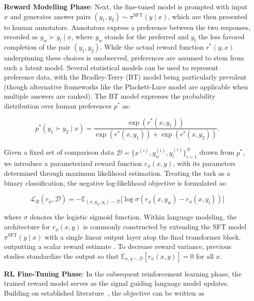 \textbf{Reward Modelling Phase}: Next, the fine-tuned model is prompted with input $x$ and generates answer pairs $(y_1, y_2)\sim \pi^\text{SFT}(y \mid x)$, which are then presented to human annotators. Annotators express a preference between the two responses, recorded as $y_w\succ y_l \mid x$, where $y_w$ stands for the preferred and $y_l$ the less favored completion of the pair $(y_1, y_2)$. While the actual reward function $r^*(y, x)$ underpinning these choices is unobserved, preferences are assumed to stem from such a latent model. Several statistical models can be used to represent preference data, with the Bradley-Terry (BT) model \cite{bradley1952rankanalysis} being particularly prevalent (though alternative frameworks like the Plackett-Luce model \citep{plackett1975analysis, luce2012individual} are applicable when multiple answers are ranked). The BT model expresses the probability distribution over human preferences $p^*$ as:

\begin{equation}\label{eq:bradley-terry}
    p^*(y_1\succ y_2 \mid x)=\frac{\exp\left(r^*(x, y_1)\right)}{\exp\left(r^*(x, y_1)\right) + \exp\left(r^*(x, y_2)\right)}.
\end{equation}

Given a fixed set of comparison data $\mathcal{D}=\bigl\{x^{(i)}, y_w^{(i)}, y_l^{(i)}\bigr\}_{i=1}^N$ drawn from $p^*$, we introduce a parameterized reward function $r_{\phi}(x, y)$, with its parameters determined through maximum likelihood estimation. Treating the task as a binary classification, the negative log-likelihood objective is formulated as:

\begin{equation}\label{eq:reward_model}
    \mathcal{L}_R(r_{\phi}, \mathcal{D}) = -\mathbb{E}_{(x, y_w, y_l)\sim \mathcal{D}}\bigl[\log \sigma(r_{\phi}(x, y_w)- r_{\phi}(x, y_l))\bigr]
\end{equation}

where $\sigma$ denotes the logistic sigmoid function. Within language modeling, the architecture for $r_{\phi}(x, y)$ is commonly constructed by extending the SFT model $\pi^\text{SFT}(y \mid x)$ with a single linear output layer atop the final transformer block, outputting a scalar reward estimate \cite{ziegler2020finetuning}. To decrease reward variance, previous studies standardize the output so that $\mathbb{E}_{x,y\sim \mathcal{D}}\left[r_\phi(x, y)\right] = 0$ for all $x$.

\textbf{RL Fine-Tuning Phase}: In the subsequent reinforcement learning phase, the trained reward model serves as the signal guiding language model updates. Building on established literature~\citep{jaques2017sequence, jaques2020human}, the objective can be written as

